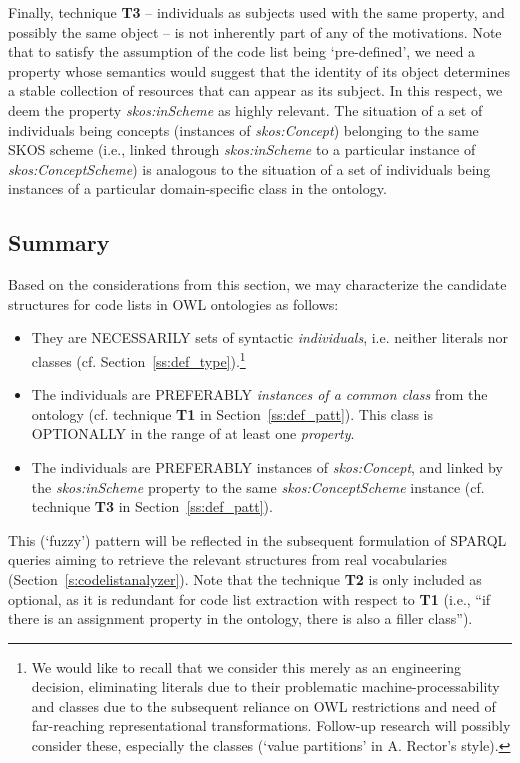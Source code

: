 Finally, technique \textbf{T3} -- individuals as subjects used with the same property, and possibly the same object -- is not inherently part of any of the motivations.
Note that to satisfy the assumption of the code list being `pre-defined', we need a property whose semantics would suggest that the identity of its object determines a stable collection of resources that can appear as its subject.
In this respect, we deem the property \emph{skos:inScheme} as highly relevant.
The situation of a set of individuals being concepts (instances of \emph{skos:Concept}) belonging to the same SKOS scheme (i.e., linked through \emph{skos:inScheme} to a particular instance of \emph{skos:ConceptScheme}) is analogous to the situation of a set of individuals being instances of a particular domain-specific class in the ontology.

\subsection{Summary}
Based on the considerations from this section, we may characterize the candidate structures for code lists in OWL ontologies as follows: 
\begin{itemize}
    \item They are NECESSARILY sets of syntactic \emph{individuals}, i.e. neither literals nor classes (cf. Section~\ref{ss:def_type}).\footnote{We would like to recall that we consider this merely as an engineering decision, eliminating literals due to their problematic machine-processability and classes due to the subsequent reliance on OWL restrictions and need of far-reaching representational transformations. Follow-up research will possibly consider these, especially the classes (`value partitions' in A. Rector's style).} 
    \item The individuals are PREFERABLY \emph{instances of a common class} from the ontology (cf. technique \textbf{T1} in Section~\ref{ss:def_patt}).
    This class is OPTIONALLY in the range of at least one \emph{property}.
    \item The individuals are PREFERABLY instances of \emph{skos:Concept}, and linked by the \emph{skos:inScheme} property to the same \emph{skos:ConceptScheme} instance (cf. technique \textbf{T3} in Section~\ref{ss:def_patt}).
\end{itemize}
This (`fuzzy') pattern will be reflected in the subsequent formulation of SPARQL queries aiming to retrieve the relevant structures from real vocabularies (Section~\ref{s:codelistanalyzer}).
Note that the technique \textbf{T2} is only included as optional, as it is redundant for code list extraction with respect to \textbf{T1} (i.e., ``if there is an assignment property in the ontology, there is also a filler class''). 

